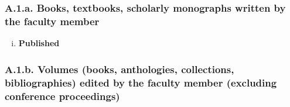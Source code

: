 \documentclass[12pt]{article}
\begin{document}

\subsubsection*{A.1.a. Books, textbooks, scholarly monographs written by the faculty member}


\begin{enumerate}[i)]
\item {\bf Published}  %
\end{enumerate}


\subsubsection*{A.1.b. Volumes (books, anthologies, collections, bibliographies) edited by the faculty member (excluding conference proceedings)}
\end{document}
